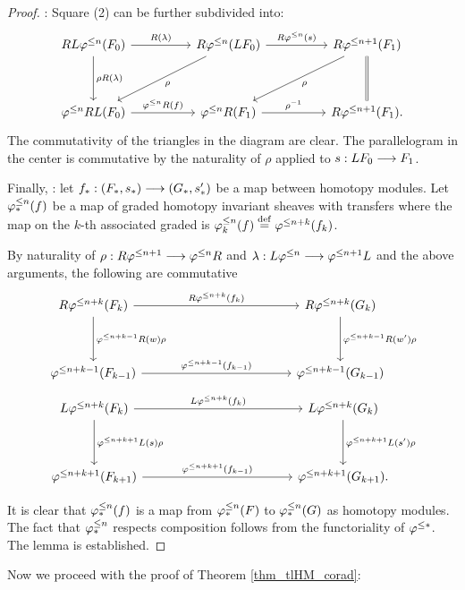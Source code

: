 \begin{proof}
 : Square (2) can be further 
subdivided into:
\[
\begin{tikzcd}[row sep=huge, column sep=huge]
RL\tlHI{n}(F_0) \arrow{r}{R(\lambda)} \arrow{d}{\rho R(\lambda)} &
R\tlHI{n}(LF_0) \arrow{ld}{\rho} \arrow{r}{R\tlHI{n}(\susp)} &
R\tlHI{n + 1}(F_1) \arrow{ld}{\rho} \arrow[equals]{d} \\
\tlHI{n} RL(F_0) \arrow{r}{\tlHI{n} R(f)} &
\tlHI{n} R(F_1) \arrow{r}{\rho^{-1}} &
R\tlHI{n + 1}(F_1).
\end{tikzcd}
\]
The commutativity of the triangles in the diagram are clear. The 
parallelogram in the center is commutative by the naturality of
$\rho$ applied to $\susp: LF_0 \to F_1$.

Finally, 
 : let $f_*: (F_*,\susp_*) \to 
(G_*, \susp_*')$ be a map between homotopy modules. Let 
$\tlHM{n}(f)$ be a map of graded homotopy invariant sheaves with 
transfers where the map on the $k$-th associated graded is 
$\tlHM[k]{n}(f) \defeq \tlHI{n + k}(f_k)$. 

By naturality of $\rho : R\tlHI{n + 1} \to \tlHI{n} R$ and 
$\lambda: L\tlHI{n} \to \tlHI{n + 1}L$ and the above arguments, 
the following are commutative
\[
\begin{tikzcd}[column sep=12em, row sep=huge]
R\tlHI{n + k}(F_k) \arrow{r}{R \tlHI{n + k}(f_k)} 
   \arrow{d}{\tlHI{n + k - 1}R(\deloop) \rho} &
R\tlHI{n + k}(G_k) 
   \arrow{d}{\tlHI{n + k - 1}R(\deloop') \rho} \\
\tlHI{n + k - 1}(F_{k - 1}) 
   \arrow{r}{\tlHI{n + k - 1}(f_{k - 1})} &
\tlHI{n + k - 1}(G_{k - 1}) 
\end{tikzcd}
\]
\[
\begin{tikzcd}[column sep=12em, row sep=huge]
L\tlHI{n + k}(F_k) \arrow{r}{L \tlHI{n + k}(f_k)} 
   \arrow{d}{\tlHI{n + k + 1}L(\susp) \rho} &
L\tlHI{n + k}(G_k) 
   \arrow{d}{\tlHI{n + k + 1}L(\susp') \rho} \\
\tlHI{n + k + 1}(F_{k + 1}) 
   \arrow{r}{\tlHI{n + k + 1}(f_{k - 1})} &
\tlHI{n + k + 1}(G_{k + 1}).
\end{tikzcd}
\]

It is clear that $\tlHM{n}(f)$ is a map from $\tlHM{n}(F)$ to 
$\tlHM{n}(G)$ as homotopy modules. The fact that $\tlHM{n}$ 
respects composition follows from the functoriality of $\tlHI{*}$.
The lemma is established.
\end{proof}

Now we proceed with the proof of Theorem \ref{thm_tlHM_corad}:

